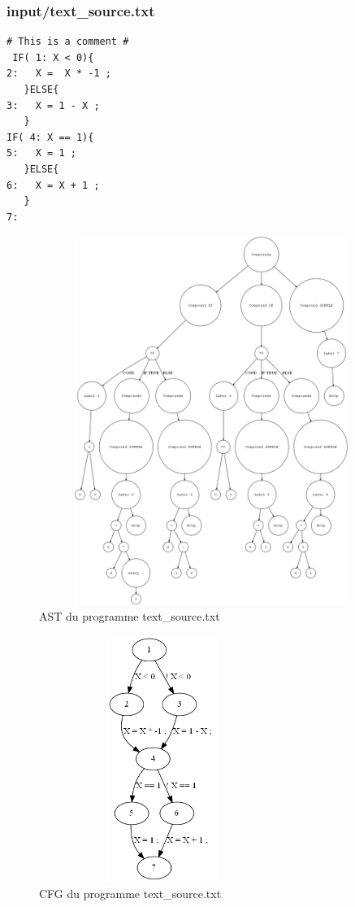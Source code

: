 \documentclass[a4paper]{article}
\begin{document}
\subsubsection{input/text\_source.txt}

\begin{verbatim}
# This is a comment #
 IF( 1: X < 0){
2:   X =  X * -1 ;
   }ELSE{
3:   X = 1 - X ;
   }
IF( 4: X == 1){
5:   X = 1 ;
   }ELSE{
6:   X = X + 1 ;
   }
7:
\end{verbatim}

\begin{figure}[h!]
  \centering
  \includegraphics[width=12cm,height=12cm,keepaspectratio]{input/text_source_ast.png}
  \caption{AST du programme text\_source.txt}
  \label{fig:ast2}
\end{figure}

\begin{figure}[h!]
  \centering
  \includegraphics[width=8cm,height=8cm,keepaspectratio]{input/text_source_cfg.png}
  \caption{CFG du programme text\_source.txt}
  \label{fig:cfg2}
\end{figure}
\end{document}
